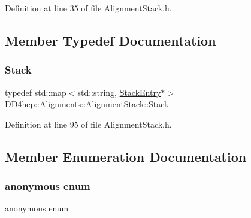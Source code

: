 Definition at line 35 of file Alignment\+Stack.\+h.



\subsection{Member Typedef Documentation}
\hypertarget{class_d_d4hep_1_1_alignments_1_1_alignment_stack_a14076338e30231119d5d291b5ac316ee}{}\label{class_d_d4hep_1_1_alignments_1_1_alignment_stack_a14076338e30231119d5d291b5ac316ee} 
\subsubsection{\texorpdfstring{Stack}{Stack}}
{\footnotesize\ttfamily typedef std\+::map$<$std\+::string, \hyperlink{struct_d_d4hep_1_1_alignments_1_1_alignment_stack_1_1_stack_entry}{Stack\+Entry}$\ast$$>$ \hyperlink{class_d_d4hep_1_1_alignments_1_1_alignment_stack_a14076338e30231119d5d291b5ac316ee}{D\+D4hep\+::\+Alignments\+::\+Alignment\+Stack\+::\+Stack}}



Definition at line 95 of file Alignment\+Stack.\+h.



\subsection{Member Enumeration Documentation}
\hypertarget{class_d_d4hep_1_1_alignments_1_1_alignment_stack_a52684bf45771fe0444855e41ae789569}{}\label{class_d_d4hep_1_1_alignments_1_1_alignment_stack_a52684bf45771fe0444855e41ae789569} 
\subsubsection{\texorpdfstring{anonymous enum}{anonymous enum}}
{\footnotesize\ttfamily anonymous enum}

